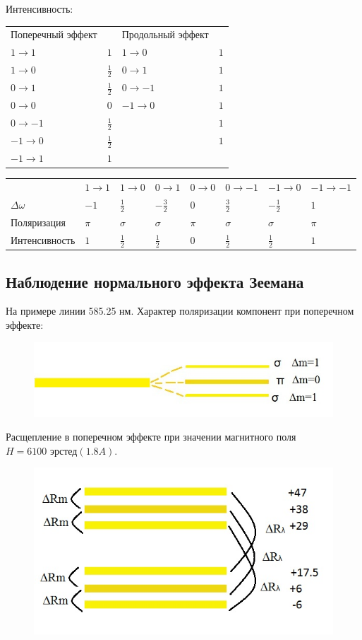 Интенсивность:

\begin{tabular}{ | l | l | l | l |}
\hline
$\text{Поперечный эффект}$ & $ $ & $\text{Продольный эффект}$ & $ $ \\
$1 \rightarrow 1$ & $1$ & $1 \rightarrow 0$ & $1$\\
$1 \rightarrow 0$ & $\frac12$ & $0 \rightarrow 1$ & $1$\\
$0 \rightarrow 1$ & $\frac12$ & $0 \rightarrow -1$ & $1$\\
$0 \rightarrow 0$ & $0$ & $-1 \rightarrow 0$ & $1$\\
$0 \rightarrow -1$ & $\frac12$ & $ $ & $1$\\ 
$-1 \rightarrow 0$ & $\frac12$ & $ $ & $1$\\
$-1 \rightarrow 1$ & $1$ & $ $ & $ $\\
\hline
\end{tabular}

\begin{tabular}{ | l | l | l | l | l | l | l | l |}
\hline
$ $ & $1 \rightarrow 1$ & $1 \rightarrow 0$ & $0 \rightarrow 1$ & $0 \rightarrow 0$ & $0 \rightarrow -1$ & $-1 \rightarrow 0$ & $-1 \rightarrow -1$\\ 
$\Delta \omega$ & $-1$ & $\frac12$ & $-\frac32$ & $0$ & $\frac32$ & $-\frac12$ & $1$\\ 
$\text{Поляризация}$ & $\pi$ & $\sigma$ & $\sigma$ & $\pi$ & $\sigma$ & $\sigma$ & $\pi$\\
$\text{Интенсивность}$ & $1$ & $\frac12$ & $\frac12$ & $0$ & $\frac12$ & $\frac12$ & $1$ \\
\hline
\end{tabular}

\subsection{Наблюдение нормального эффекта Зеемана}
На примере линии 585.25 нм.
Характер поляризации компонент при поперечном эффекте:
\begin{figure}[H]
	\centering
	\includegraphics[width=0.5\linewidth]{fig/fig15}
	\caption{}
	\label{fig:fig16}
\end{figure}

Расщепление в поперечном эффекте при значении магнитного поля $H=6100 \text{ эрстед} (1.8 A)$.
\begin{figure}[H]
	\centering
	\includegraphics[width=0.5\linewidth]{fig/fig16}
	\caption{}
	\label{fig:fig17}
\end{figure}


